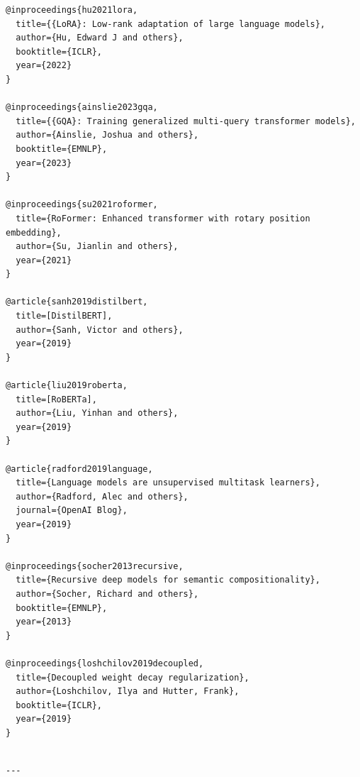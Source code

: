 \begin{lstlisting}
@inproceedings{hu2021lora,
  title={{LoRA}: Low-rank adaptation of large language models},
  author={Hu, Edward J and others},
  booktitle={ICLR},
  year={2022}
}

@inproceedings{ainslie2023gqa,
  title={{GQA}: Training generalized multi-query transformer models},
  author={Ainslie, Joshua and others},
  booktitle={EMNLP},
  year={2023}
}

@inproceedings{su2021roformer,
  title={RoFormer: Enhanced transformer with rotary position embedding},
  author={Su, Jianlin and others},
  year={2021}
}

@article{sanh2019distilbert,
  title=[DistilBERT],
  author={Sanh, Victor and others},
  year={2019}
}

@article{liu2019roberta,
  title=[RoBERTa],
  author={Liu, Yinhan and others},
  year={2019}
}

@article{radford2019language,
  title={Language models are unsupervised multitask learners},
  author={Radford, Alec and others},
  journal={OpenAI Blog},
  year={2019}
}

@inproceedings{socher2013recursive,
  title={Recursive deep models for semantic compositionality},
  author={Socher, Richard and others},
  booktitle={EMNLP},
  year={2013}
}

@inproceedings{loshchilov2019decoupled,
  title={Decoupled weight decay regularization},
  author={Loshchilov, Ilya and Hutter, Frank},
  booktitle={ICLR},
  year={2019}
}
\end{lstlisting}
\begin{lstlisting}

---
\end{lstlisting}